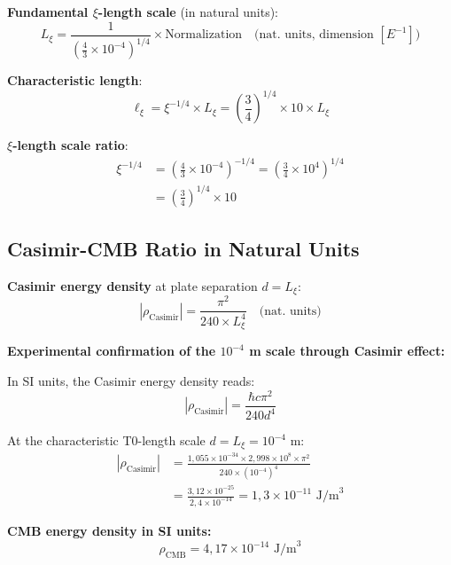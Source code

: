 \documentclass[12pt,a4paper]{article}
\begin{document}
	\textbf{Fundamental $\xi$-length scale} (in natural units):
	\begin{equation}
		L_\xi = \frac{1}{\left(\frac{4}{3} \times 10^{-4}\right)^{1/4}} \times \text{Normalization} \quad \text{(nat. units, dimension } [E^{-1}] \text{)}
	\end{equation}
	
	\textbf{Characteristic length}:
	\begin{equation}
		\ell_{\xi} = \xi^{-1/4} \times L_\xi = \left(\frac{3}{4}\right)^{1/4} \times 10 \times L_\xi
	\end{equation}
	
	\textbf{$\xi$-length scale ratio}:
	\begin{align}
		\xi^{-1/4} &= \left(\frac{4}{3} \times 10^{-4}\right)^{-1/4} = \left(\frac{3}{4} \times 10^4\right)^{1/4} \\
		&= \left(\frac{3}{4}\right)^{1/4} \times 10
	\end{align}
	
	\subsection{Casimir-CMB Ratio in Natural Units}
	
	\textbf{Casimir energy density} at plate separation $d = L_\xi$:
	\begin{equation}
		|\rho_{\text{Casimir}}| = \frac{\pi^2}{240 \times L_\xi^4} \quad \text{(nat. units)}
	\end{equation}
	
	\textbf{Experimental confirmation of the $10^{-4}$ m scale through Casimir effect:}
	
	In SI units, the Casimir energy density reads:
	\begin{equation}
		|\rho_{\text{Casimir}}| = \frac{\hbar c \pi^2}{240 d^4}
	\end{equation}
	
	At the characteristic T0-length scale $d = L_\xi = 10^{-4}$ m:
	\begin{align}
		|\rho_{\text{Casimir}}| &= \frac{1{,}055 \times 10^{-34} \times 2{,}998 \times 10^8 \times \pi^2}{240 \times (10^{-4})^4} \\
		&= \frac{3{,}12 \times 10^{-25}}{2{,}4 \times 10^{-14}} = 1{,}3 \times 10^{-11} \text{ J/m}^3
	\end{align}
	
	\textbf{CMB energy density in SI units:}
	\begin{equation}
		\rho_{\text{CMB}} = 4{,}17 \times 10^{-14} \text{ J/m}^3
	\end{equation}
	
\end{document}
